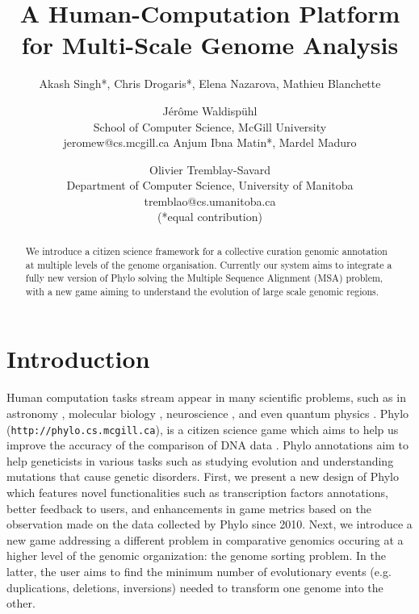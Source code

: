 \documentclass{article}
\begin{document}
\title{A Human-Computation Platform for Multi-Scale Genome Analysis}


\author{Akash Singh*, Chris Drogaris*, Elena Nazarova, Mathieu Blanchette \and J\'er\^ome Waldisp\"uhl\\ School of Computer Science, McGill University \\ jeromew@cs.mcgill.ca \AND
Anjum Ibna Matin*, Mardel Maduro \and Olivier Tremblay-Savard \\ Department of Computer Science, University of Manitoba \\ tremblao@cs.umanitoba.ca \\ (*equal contribution)}

\maketitle
\begin{abstract}
We introduce a citizen science framework for a collective curation genomic annotation at multiple levels of the genome organisation. Currently our system aims to integrate a fully new version of Phylo solving the Multiple Sequence Alignment (MSA) problem, with a new game aiming to understand the evolution of large scale genomic regions.
\end{abstract}
\section{Introduction}
Human computation tasks stream appear in many scientific problems, such as in astronomy \cite{skibba2012galaxy}, molecular biology \cite{cooper2010predicting,kawrykow2012phylo}, neuroscience \cite{kim2014space}, and even quantum physics \cite{lieberoth2015getting}.
Phylo (\texttt{http://phylo.cs.mcgill.ca}), is a citizen science game which aims to help us improve the accuracy of the comparison of DNA data \cite{kawrykow2012phylo,kwak2013open}. Phylo annotations aim to help geneticists in various tasks such as studying evolution and understanding mutations that cause genetic disorders. First, we present a new design of Phylo which features novel functionalities such as transcription factors annotations, better feedback to users, and enhancements in game metrics based on the observation made on the data collected by Phylo since 2010.
Next, we introduce a new game addressing a different problem in comparative genomics occuring at a higher level of the genomic organization: the genome sorting problem. In the latter, the user aims to find the minimum number of evolutionary events (e.g. duplications, deletions, inversions) needed to transform one genome into the other.
\end{document}
